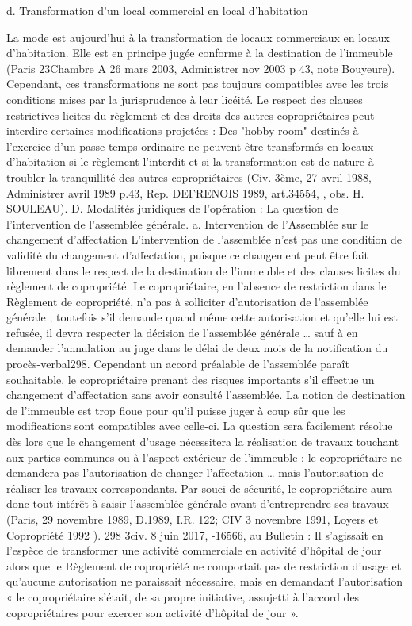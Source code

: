 			d. Transformation d’un local commercial en local d’habitation

			La mode est aujourd’hui à la transformation de locaux commerciaux en locaux d’habitation. Elle est en principe jugée conforme à la destination de l’immeuble (Paris 23\degres Chambre A 26 mars 2003, Administrer nov 2003 p 43, note Bouyeure).
			Cependant, ces transformations ne sont pas toujours compatibles avec les trois conditions mises par la jurisprudence à leur licéité.
			Le respect des clauses restrictives licites du règlement et des droits des autres copropriétaires peut interdire certaines modifications projetées : Des "hobby-room" destinés à l'exercice d'un passe-temps ordinaire ne peuvent être transformés en locaux d'habitation si le règlement l'interdit et si la transformation est de nature à troubler la tranquillité des autres copropriétaires (Civ. 3ème, 27 avril 1988, Administrer avril 1989 p.43, Rep. DEFRENOIS 1989, art.34554, , obs. H. SOULEAU).
			D. Modalités juridiques de l'opération : La question de l'intervention de l'assemblée générale.
			a. Intervention de l’Assemblée sur le changement d’affectation
			L'intervention de l'assemblée n'est pas une condition de validité du changement d'affectation, puisque ce changement peut être fait librement dans le respect de la destination de l’immeuble et des clauses licites du règlement de copropriété. Le copropriétaire, en l’absence de restriction dans le Règlement de copropriété, n’a pas à solliciter d’autorisation de l’assemblée générale ; toutefois s’il demande quand même cette autorisation et qu’elle lui est refusée, il devra respecter la décision de l’assemblée générale … sauf à en demander l’annulation au juge dans le délai de deux mois de la notification du procès-verbal298.
			Cependant un accord préalable de l'assemblée paraît souhaitable, le copropriétaire prenant des risques importants s'il effectue un changement d’affectation sans avoir consulté l'assemblée. La notion de destination de l'immeuble est trop floue pour qu'il puisse juger à coup sûr que les modifications sont compatibles avec celle-ci. La question sera facilement résolue dès lors que le changement d’usage nécessitera la réalisation de travaux touchant aux parties communes ou à l’aspect extérieur de l’immeuble : le copropriétaire ne demandera pas l’autorisation de changer l’affectation … mais l’autorisation de réaliser les travaux correspondants.
			Par souci de sécurité, le copropriétaire aura donc tout intérêt à saisir l'assemblée générale avant d'entreprendre ses travaux (Paris, 29 novembre 1989, D.1989, I.R. 122; CIV 3 novembre 1991, Loyers et Copropriété 1992 ).
			298 3\degres civ. 8 juin 2017, -16566, au Bulletin : Il s’agissait en l’espèce de transformer une activité commerciale en activité d’hôpital de jour alors que le Règlement de copropriété ne comportait pas de restriction d’usage et qu’aucune autorisation ne paraissait nécessaire, mais en demandant l’autorisation « le copropriétaire s'était, de sa propre initiative, assujetti à l'accord des copropriétaires pour exercer son activité d'hôpital de jour ».

